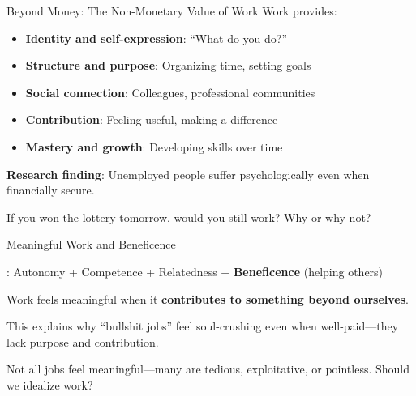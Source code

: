 ﻿\documentclass[aspectratio=169,11pt]{beamer}
\begin{document}
\begin{frame}{Beyond Money: The Non-Monetary Value of Work}
Work provides:
\begin{itemize}
    \item \textbf{Identity and self-expression}: ``What do you do?''
    \item \textbf{Structure and purpose}: Organizing time, setting goals
    \item \textbf{Social connection}: Colleagues, professional communities
    \item \textbf{Contribution}: Feeling useful, making a difference
    \item \textbf{Mastery and growth}: Developing skills over time
\end{itemize}

\vspace{0.2em}
\textbf{Research finding}: Unemployed people suffer psychologically even when financially secure.

\vspace{0.2em}
\begin{discussionbox}
\small
If you won the lottery tomorrow, would you still work? Why or why not?
\end{discussionbox}
\end{frame}

\begin{frame}{Meaningful Work and Beneficence}
\begin{conceptbox}
\small
\parencite{martela_ryan_2016}: Autonomy + Competence + Relatedness + \textbf{Beneficence} (helping others)
\end{conceptbox}

\vspace{0.2em}
Work feels meaningful when it \textbf{contributes to something beyond ourselves}.

\vspace{0.2em}
This explains why ``bullshit jobs'' \parencite{graeber_bullshit_jobs} feel soul-crushing even when well-paid---they lack purpose and contribution.

\vspace{0.2em}
\begin{objectionbox}[Objection]
\small
Not all jobs feel meaningful---many are tedious, exploitative, or pointless. Should we idealize work?
\end{objectionbox}
\end{frame}
\end{document}
